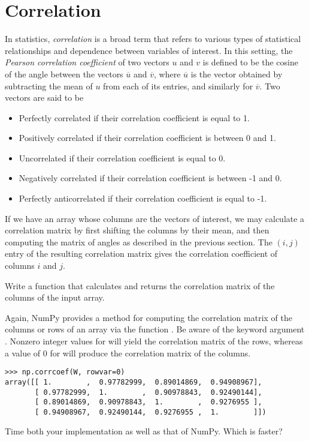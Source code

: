 \section*{Correlation}
In statistics, \emph{correlation} is a broad term that refers to various types of statistical relationships and dependence between
variables of interest.
In this setting, the \emph{Pearson correlation coefficient} of two vectors $u$ and $v$ is defined to be the cosine of the angle between the
vectors $\overline{u}$ and $\overline{v}$, where $\overline{u}$ is the vector obtained by subtracting the mean of $u$ from each of its entries,
and similarly for $\overline{v}$.
Two vectors are said to be
\begin{itemize}
\item Perfectly correlated if their correlation coefficient is equal to 1.
\item Positively correlated if their correlation coefficient is between 0 and 1.
\item Uncorrelated if their correlation coefficient is equal to 0.
\item Negatively correlated if their correlation coefficient is between -1 and 0.
\item Perfectly anticorrelated if their correlation coefficient is equal to -1.
\end{itemize}

If we have an array whose columns are the vectors of interest, we may calculate a correlation matrix
by first shifting the columns by their mean, and then computing the matrix of angles as described in the
previous section. The $(i,j)$ entry of the resulting correlation matrix gives the correlation coefficient
of columns $i$ and $j$.

\begin{problem}
Write a function  that calculates and returns the correlation matrix of the columns of the input array.
\end{problem}
Again, NumPy provides a method for computing the correlation matrix of the columns or rows of an array via the function .
Be aware of the keyword argument .
Nonzero integer values for  will yield the correlation matrix of the rows, whereas a value of 0 for  will produce the correlation matrix of the columns.
\begin{lstlisting}
>>> np.corrcoef(W, rowvar=0)
array([[ 1.        ,  0.97782999,  0.89014869,  0.94908967],
       [ 0.97782999,  1.        ,  0.90978843,  0.92490144],
       [ 0.89014869,  0.90978843,  1.        ,  0.9276955 ],
       [ 0.94908967,  0.92490144,  0.9276955 ,  1.        ]])
\end{lstlisting}
Time both your implementation as well as that of NumPy. Which is faster?


